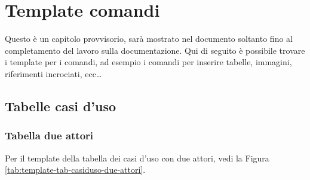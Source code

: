 
\chapter{Template comandi}
\label{chp:templateComandi}

Questo è un capitolo provvisorio, sarà mostrato nel documento soltanto fino al completamento del lavoro sulla documentazione. Qui di seguito è possibile trovare i template per i comandi, ad esempio i comandi per inserire tabelle, immagini, riferimenti incrociati, ecc\dots

\section{Tabelle casi d'uso}
\label{sec:tabelle-casi-duso}

\subsection{Tabella due attori}

Per il template della tabella dei casi d'uso con due attori, vedi la Figura \vref{tab:template-tab-casiduso-due-attori}.

